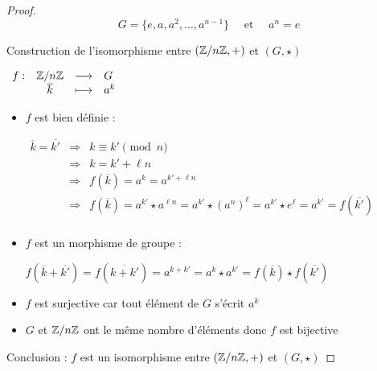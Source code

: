 \begin{frame}

\begin{proof}
$$G = \big\{e, a, a^2, \ldots, a^{n-1}\big\} \quad  \text{ et } \quad a^n = e$$


Construction de l'isomorphisme entre $(\mathbb{Z}/n\mathbb{Z},+)$ et $(G,\star)$

\pause
\medskip

\hfil 
$
\begin{array}{rccl}
f : & \mathbb{Z}/n\mathbb{Z} & \longrightarrow & G \\
    &  \overline k & \longmapsto & a^k  \\
\end{array}
$
\pause

\begin{itemize}
 \item  $f$ est bien définie :

$\begin{array}{rcl}
 \overline{k}=\overline{k'} 
    & \Rightarrow & k \equiv k' \pmod n \\
    & \Rightarrow & k = k' + \ell n \\
    & \Rightarrow & f(\overline{k}) = a^k = a^{k'+\ell n}  \\
    & \Rightarrow & f(\overline{k}) = a^{k'} \star a^{\ell n}=
a^{k'} \star (a^n)^\ell= a^{k'} \star e^\ell = a^{k'} = f(\overline{k'}) \\
\end{array}$

\pause
  \item $f$ est un morphisme de groupe :

 $f(\overline{k}+\overline{k'})
= f(\overline{k+k'}) = a^{k+k'}=a^{k} \star a^{k'}= f(\overline k) \star f(\overline{k'})$ 

\pause
  \item $f$ est surjective car tout élément de $G$ s'écrit $a^k$

\pause
  \item $G$ et $\mathbb{Z}/n\mathbb{Z}$ ont le même nombre d'éléments donc $f$ est bijective
\end{itemize}

\medskip
\pause

Conclusion : $f$ est un isomorphisme entre $(\mathbb{Z}/n\mathbb{Z},+)$ et $(G,\star)$
\end{proof}

\end{frame}



